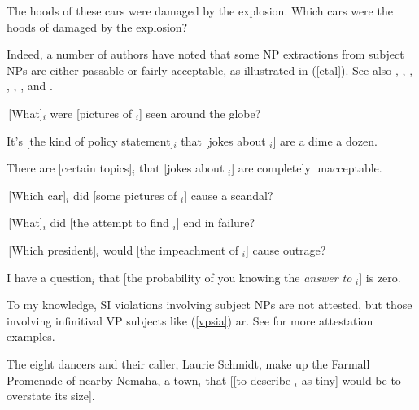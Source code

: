 \documentclass[output=paper]{langsci/langscibook}
\begin{document}
\ea
\ea The hoods of these cars were damaged by the explosion. 
\ex \bad{*}Which cars were the hoods of damaged by the explosion?\\
\citep{Ross67}
\z \label{rosssi}
\z


\noindent
Indeed, a   number of authors  have noted that some NP extractions from subject NPs are either passable or
 fairly acceptable,   as illustrated  in (\ref{etal}). See also
 \citet[195,ft.32]{pollardsag},
 \citet{postal98},
  \citet[304]{sauerelb},   
  \citet[230]{culicover99},
  \citet[265]{levhubook},  \citet[470,471]{chavesextr},
and \citet{chavesjeruen}.

  
\ea

\ea \,[What]$_i$ were [pictures of \spc$_i$] seen around the globe?\\
  \citep[268]{kluender} 


\ex It's [the kind of policy statement]$_i$ that [jokes about \spc$_i$] are a dime a dozen.\\
\citep[204]{levineetal}


\ex There are [certain topics]$_i$ that [jokes about \spc$_i$] are completely unacceptable.\\
\citep[252, ft.6]{Levine:Sag:03}

\ex  \,[Which car]$_i$ did [some pictures of \spc$_i$] cause a scandal?\\
 \citep[111]{fernandez}
 
 \ex \,[What]$_i$ did [the attempt to find \spc$_i$] end in failure?\\
 \citep[370]{hofsaglang}
 
 \ex  \,[Which president]$_i$ would [the  impeachment of \spc$_i$] cause  outrage?\\
 \citep{chavesextr}
 
 \ex I have a question$_i$ that [the probability of you knowing the {\slshape answer to} \spc$_i$] is zero.\\
\citep{chavessubj}

\z \label{etal}
\z



To my knowledge, SI violations involving subject NPs are not attested, but those involving
infinitival VP subjects like  (\ref{vpsia}) ar.
See  \citet[471]{chavesextr} for more attestation examples.


\ea
\ea The eight dancers and their caller, Laurie Schmidt, make up the
Farmall Promenade of nearby Nemaha, a town$_i$
that [[to describe \spc$_i$ as tiny] would be to overstate its size]. \\
 \citep[1094, ft.27]{hud12} 
\end{document}
